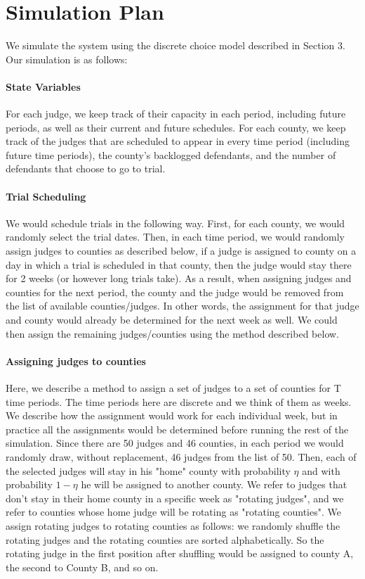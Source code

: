 \documentclass[11pt, oneside]{article}   	%
\theoremstyle{ModifiedStyle}
\begin{document}
\section{Simulation Plan}
  We simulate the system using the discrete choice model described in Section 3. Our simulation is as follows:

  \paragraph{State Variables} For each judge, we keep track of their capacity in each period, including future periods, as well as their current and future schedules. For each county, we keep track of the judges that are scheduled to appear in every time period (including future time periods), the county's backlogged defendants, and the number of defendants that choose to go to trial.

  \paragraph{Trial Scheduling} We would schedule trials in the following way. First, for each county, we would randomly select the trial dates. Then, in each time period, we would randomly assign judges to counties as described below, if a judge is assigned to county on a day in which a trial is scheduled in that county, then the judge would stay there for 2 weeks (or however long trials take). As a result, when assigning judges and counties for the next period, the county and the judge would be removed from the list of available counties/judges. In other words, the assignment for that judge and county would already be determined for the next week as well. We could then assign the remaining judges/counties using the method described below.

  \paragraph{Assigning judges to counties} Here, we describe a method to assign a set of judges to a set of counties for T time periods. The time periods here are discrete and we think of them as weeks. We describe how the assignment would work for each individual week, but in practice all the assignments would be determined before running the rest of the simulation. Since there are 50 judges and 46 counties, in each period we would randomly draw, without replacement, 46 judges from the list of 50. Then, each of the selected judges will stay in his "home" county with probability $\eta$ and with probability $1-\eta$ he will be assigned to another county. We refer to judges that don't stay in their home county in a specific week as "rotating judges", and we refer to counties whose home judge will be rotating as "rotating counties". We assign rotating judges to rotating counties as follows: we randomly shuffle the rotating judges and the rotating counties are sorted alphabetically. So the rotating judge in the first position after shuffling would be assigned to county A, the second to County B, and so on.
\end{document}
